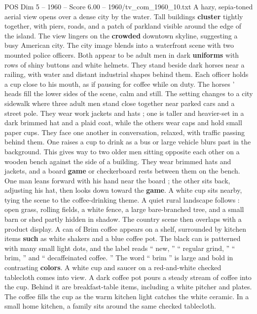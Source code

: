 \begin{textsample}{POS Dim 5 – 1960 – Score 6.00 – 1960/tv\_com\_1960\_10.txt}  \label{ex:f5_pos_053}
A hazy, sepia-toned aerial view opens over a dense city by the water.
Tall buildings \textbf{cluster} tightly together, with piers, roads, and a patch of parkland visible around the edge of the island.
The view lingers on the \textbf{crowded} downtown skyline, suggesting a busy American city.
The city image blends into a waterfront scene with two mounted police officers.
Both appear to be adult men in dark \textbf{uniforms} with rows of shiny buttons and white helmets.
They stand beside dark horses near a railing, with water and distant industrial shapes behind them.
Each officer holds a cup close to his mouth, as if pausing for coffee while on duty.
The horses ’ heads fill the lower sides of the scene, calm and still.
The setting changes to a city sidewalk where three adult men stand close together near parked cars and a street pole.
They wear work jackets and hats ; one is taller and heavier-set in a dark brimmed hat and a plaid coat, while the others wear caps and hold small paper cups.
They face one another in conversation, relaxed, with traffic passing behind them.
One raises a cup to drink as a bus or large vehicle blurs past in the background.
This gives way to two older men sitting opposite each other on a wooden bench against the side of a building.
They wear brimmed hats and jackets, and a board \textbf{game} or checkerboard rests between them on the bench.
One man leans forward with his hand near the board ; the other sits back, adjusting his hat, then looks down toward the \textbf{game}.
A white cup sits nearby, tying the scene to the coffee-drinking theme.
A quiet rural landscape follows : open grass, rolling fields, a white fence, a large bare-branched tree, and a small barn or shed partly hidden in shadow.
The country scene then overlaps with a product display.
A can of Brim coffee appears on a shelf, surrounded by kitchen items \textbf{such} as white shakers and a blue coffee pot.
The black can is patterned with many small light dots, and the label reads “ new, ” “ regular grind, ” “ brim, ” and “ decaffeinated coffee. ” The word “ brim ” is large and bold in contrasting \textbf{colors}.
A white cup and saucer on a red-and-white checked tablecloth comes into view.
A dark coffee pot pours a steady stream of coffee into the cup.
Behind it are breakfast-table items, including a white pitcher and plates.
The coffee fills the cup as the warm kitchen light catches the white ceramic.
In a small home kitchen, a family sits around the same checked tablecloth.

\end{textsample}
